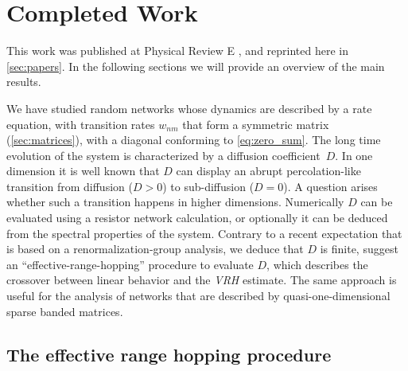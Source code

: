 \chapter{Completed Work}


This work was published at Physical Review E \cite{de_leeuw_diffusion_2012},
and reprinted here in \autoref{sec:papers}. In the
following sections we will provide an overview
of the main results.









We have studied random networks whose dynamics are
described by a rate equation, with transition rates $w_{nm}$
that form a symmetric matrix (\autoref{sec:matrices}),
with a diagonal conforming to \autoref{eq:zero_sum}. 
%
The long time evolution
of the system is characterized by a diffusion coefficient~$D$.
In one dimension it is well known that $D$ can display an abrupt
percolation-like transition from diffusion (${D>0}$)
to sub-diffusion (${D=0}$). 
%
A question arises whether
such a transition happens in higher dimensions.
Numerically $D$ can be evaluated using a resistor network
calculation, or optionally it can be deduced from 
the spectral properties of the system. 
%
Contrary to a recent 
expectation that is based on a renormalization-group analysis, 
we deduce that $D$ is finite,
%
suggest an ``effective-range-hopping'' procedure to evaluate $D$,
which describes the crossover between linear behavior and the \emph{VRH}
estimate.
The same approach is useful for the analysis of 
networks that are described by quasi-one-dimensional  
sparse banded matrices. 


\section{The effective range hopping procedure}

